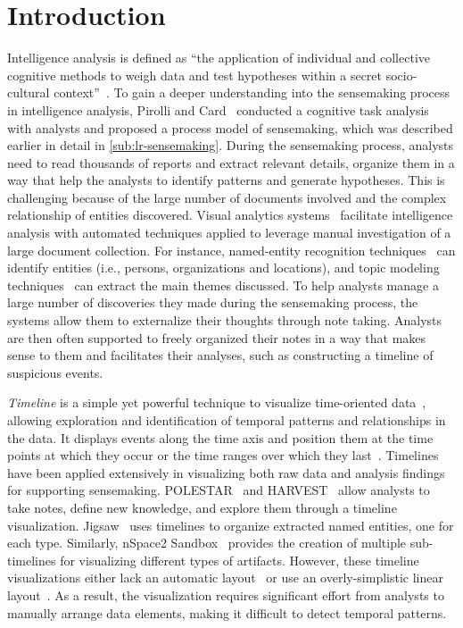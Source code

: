 \section{Introduction}
Intelligence analysis is defined as ``the application of individual and collective cognitive methods to weigh data and test hypotheses within a secret socio-cultural context''~\cite{Johnston2005}. To gain a deeper understanding into the sensemaking process in intelligence analysis, Pirolli and Card~\cite{Pirolli2005} conducted a cognitive task analysis with analysts and proposed a process model of sensemaking, which was described earlier in detail in \autoref{sub:lr-sensemaking}. During the sensemaking process, analysts need to read thousands of reports and extract relevant details, organize them in a way that help the analysts to identify patterns and generate hypotheses. This is challenging because of the large number of documents involved and the complex relationship of entities discovered. Visual analytics systems~\cite{Pioch2006,Wright2006,Stasko2007} facilitate intelligence analysis with automated techniques applied to leverage manual investigation of a large document collection. For instance, named-entity recognition techniques~\cite{Nadeau2007} can identify entities (i.e., persons, organizations and locations), and topic modeling techniques~\cite{Blei2003} can extract the main themes discussed. To help analysts manage a large number of discoveries they made during the sensemaking process, the systems allow them to externalize their thoughts through note taking. Analysts are then often supported to freely organized their notes in a way that makes sense to them and facilitates their analyses, such as constructing a timeline of suspicious events.

\emph{Timeline} is a simple yet powerful technique to visualize time-oriented data~\cite{Tufte1983}, allowing exploration and identification of temporal patterns and relationships in the data. It displays events along the time axis and position them at the time points at which they occur or the time ranges over which they last~\cite{Plaisant1996}. Timelines have been applied extensively in visualizing both raw data and analysis findings for supporting sensemaking. POLESTAR~\cite{Pioch2006} and HARVEST~\cite{Gotz2006} allow analysts to take notes, define new knowledge, and explore them through a timeline visualization. Jigsaw~\cite{Gorg2013} uses timelines to organize extracted named entities, one for each type. Similarly, nSpace2 Sandbox~\cite{SandboxTimeline2012} provides the creation of multiple sub-timelines for visualizing different types of artifacts. However, these timeline visualizations either lack an automatic layout~\cite{Pioch2006} or use an overly-simplistic linear layout~\cite{SandboxTimeline2012}. As a result, the visualization requires significant effort from analysts to manually arrange data elements, making it difficult to detect temporal patterns.

